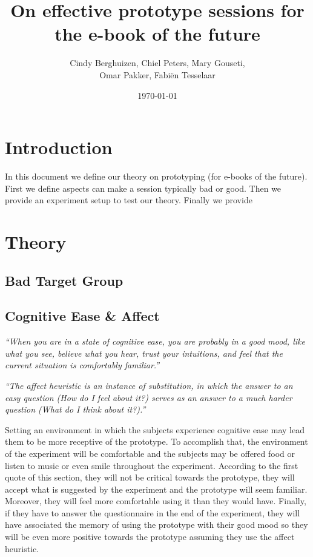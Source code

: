 \documentclass{article}
\title{On effective prototype sessions for the e-book of the future}
\author{Cindy Berghuizen, Chiel Peters, Mary Gouseti,\\ Omar Pakker, Fabi\"en Tesselaar}
\date{\today}
\begin{document}
\maketitle

\tableofcontents

\section{Introduction}
In this document we define our theory on prototyping (for e-books of the future).
First we define aspects can make a session typically bad or good. 
Then we provide an experiment setup to test our theory. Finally we provide 

\section{Theory}

\subsection{Bad Target Group}

\subsection{Cognitive Ease \& Affect}
\emph{``When you are in a state of cognitive ease, you are probably in a good mood, like what you see, believe what you hear, trust your intuitions, and feel that the current situation is comfortably familiar.''}

\emph{``The affect heuristic is an instance of substitution, in which the answer to an easy question (How do I feel about it?) serves as an answer to a much harder question (What do I think about it?).''}

Setting an environment in which the subjects experience cognitive ease may lead them to be more receptive of the prototype. To accomplish that, the environment of the experiment will be comfortable and the subjects may be offered food or listen to music or even smile throughout the experiment. According to the first quote of this section, they will not be critical towards the prototype, they will accept what is suggested by the experiment and the prototype will seem familiar. Moreover, they will feel more comfortable using it than they would have. Finally, if they have to answer the questionnaire in the end of the experiment, they will have associated the memory of using the prototype with their good mood so they will be even more positive towards the prototype assuming they use the affect heuristic.
\end{document}
